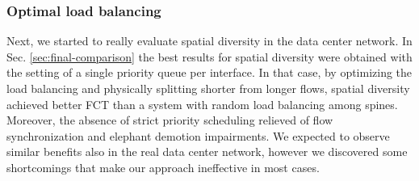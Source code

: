 \subsubsection{Optimal load balancing}
Next, we started to really evaluate spatial diversity in the data center network. In Sec.  \ref{sec:final-comparison} the best results for spatial diversity were obtained with the setting of a single priority queue per interface. In that case, by optimizing the load balancing and physically splitting shorter from longer flows, spatial diversity achieved better FCT than a system with random load balancing among spines. Moreover, the absence of strict priority scheduling relieved of flow synchronization and elephant demotion impairments. We expected to observe similar benefits also in the real data center network, however we discovered some shortcomings that make our approach ineffective in most cases. \\
